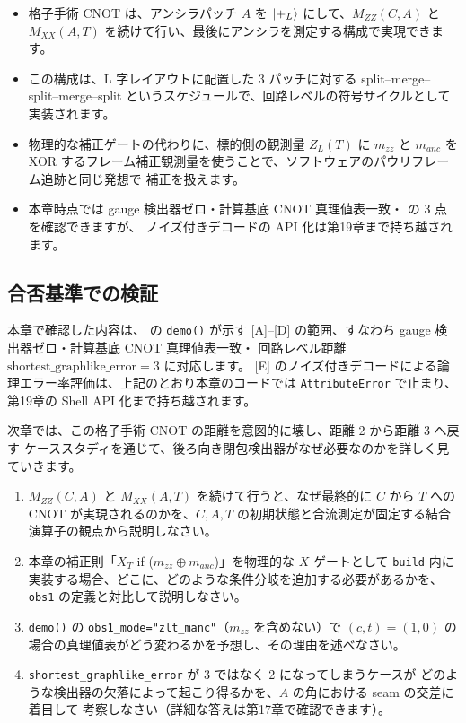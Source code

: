 \begin{itemize}
  \item 格子手術 CNOT は、アンシラパッチ $A$ を $\ket{+_L}$ にして、$M_{ZZ}(C,A)$ と
    $M_{XX}(A,T)$ を続けて行い、最後にアンシラを測定する構成で実現できます。
  \item この構成は、L 字レイアウトに配置した 3 パッチに対する
    split–merge–split–merge–split というスケジュールで、回路レベルの符号サイクルとして
    実装されます。
  \item 物理的な補正ゲートの代わりに、標的側の観測量 $Z_L(T)$ に $m_{zz}$ と $m_{anc}$ を
    XOR するフレーム補正観測量を使うことで、ソフトウェアのパウリフレーム追跡と同じ発想で
    補正を扱えます。
  \item 本章時点では gauge 検出器ゼロ・計算基底 CNOT 真理値表一致・
     の 3 点を確認できますが、
    ノイズ付きデコードの API 化は第19章まで持ち越されます。
\end{itemize}

\subsection*{合否基準での検証}

本章で確認した内容は、 の \texttt{demo()} が示す
[A]–[D] の範囲、すなわち gauge 検出器ゼロ・計算基底 CNOT 真理値表一致・
回路レベル距離 $\mathrm{shortest\_graphlike\_error}=3$ に対応します。
[E] のノイズ付きデコードによる論理エラー率評価は、上記のとおり本章のコードでは
\texttt{AttributeError} で止まり、第19章の Shell API 化まで持ち越されます。

次章では、この格子手術 CNOT の距離を意図的に壊し、距離 2 から距離 3 へ戻す
ケーススタディを通じて、後ろ向き閉包検出器がなぜ必要なのかを詳しく見ていきます。

\begin{exercise}
  \begin{enumerate}
    \item $M_{ZZ}(C,A)$ と $M_{XX}(A,T)$ を続けて行うと、なぜ最終的に $C$ から $T$ への CNOT
      が実現されるのかを、$C,A,T$ の初期状態と合流測定が固定する結合演算子の観点から説明しなさい。
    \item 本章の補正則「$X_T$ if ($m_{zz}\oplus m_{anc}$)」を物理的な $X$ ゲートとして
      \texttt{build} 内に実装する場合、どこに、どのような条件分岐を追加する必要があるかを、
      \texttt{obs1} の定義と対比して説明しなさい。
    \item \texttt{demo()} の \texttt{obs1\_mode="zlt\_manc"}（$m_{zz}$ を含めない）で
      $(c,t)=(1,0)$ の場合の真理値表がどう変わるかを予想し、その理由を述べなさい。
    \item \texttt{shortest\_graphlike\_error} が 3 ではなく 2 になってしまうケースが
      どのような検出器の欠落によって起こり得るかを、$A$ の角における seam の交差に着目して
      考察しなさい（詳細な答えは第17章で確認できます）。
  \end{enumerate}
\end{exercise}
